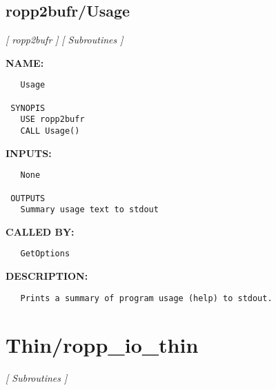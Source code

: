 \subsection{ropp2bufr/Usage}
\textsl{[ ropp2bufr ]}
\textsl{[ Subroutines ]}

\label{ch:robo103}
\label{ch:ropp2bufr_Usage}
\textbf{NAME:}\hspace{0.08in}\begin{Verbatim}
   Usage

 SYNOPIS
   USE ropp2bufr
   CALL Usage()
\end{Verbatim}
\textbf{INPUTS:}\hspace{0.08in}\begin{Verbatim}
   None

 OUTPUTS
   Summary usage text to stdout
\end{Verbatim}
\textbf{CALLED BY:}\hspace{0.08in}\begin{Verbatim}
   GetOptions
\end{Verbatim}
\textbf{DESCRIPTION:}\hspace{0.08in}\begin{Verbatim}
   Prints a summary of program usage (help) to stdout.
\end{Verbatim}
\section{Thin/ropp\_io\_thin}
\textsl{[ Subroutines ]}

